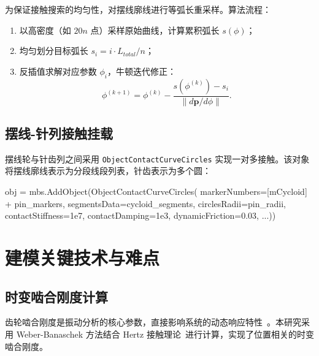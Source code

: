 \documentclass[12pt]{ctexart}
\begin{document}
为保证接触搜索的均匀性，对摆线廓线进行等弧长重采样。算法流程：
\begin{enumerate}
  \item 以高密度（如 $20n$ 点）采样原始曲线，计算累积弧长 $s(\phi)$；
  \item 均匀划分目标弧长 $s_i = i \cdot L_{total} / n$；
  \item 反插值求解对应参数 $\phi_i$，牛顿迭代修正：
  \begin{equation}
  \phi^{(k+1)} = \phi^{(k)} - \frac{s(\phi^{(k)}) - s_i}{\|d\mathbf{p}/d\phi\|}.
  \end{equation}
\end{enumerate}

\subsection{摆线-针列接触挂载}

摆线轮与针齿列之间采用 \texttt{ObjectContactCurveCircles} 实现一对多接触。该对象将摆线廓线表示为分段线段列表，针齿表示为多个圆：

\begin{pythoncode}[曲线-多圆接触创建]
obj = mbs.AddObject(ObjectContactCurveCircles(
    markerNumbers=[mCycloid] + pin_markers,
    segmentsData=cycloid_segments,
    circlesRadii=pin_radii,
    contactStiffness=1e7,
    contactDamping=1e3,
    dynamicFriction=0.03,
    ...))
\end{pythoncode}

\section{建模关键技术与难点}

\subsection{时变啮合刚度计算}

齿轮啮合刚度是振动分析的核心参数，直接影响系统的动态响应特性~\cite{rvdynamic}。本研究采用 Weber-Banaschek 方法结合 Hertz 接触理论~\cite{johnson}进行计算，实现了位置相关的时变啮合刚度。
\end{document}

